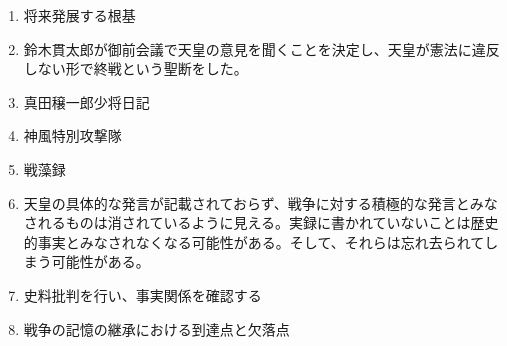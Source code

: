 \documentclass[]{jsarticle}
\begin{document}
\begin{enumerate}
	\item 将来発展する根基
	\item 鈴木貫太郎が御前会議で天皇の意見を聞くことを決定し、天皇が憲法に違反しない形で終戦という聖断をした。
	\\
	\item 真田穣一郎少将日記
	\item 神風特別攻撃隊
	\item 戦藻録
	\item 天皇の具体的な発言が記載されておらず、戦争に対する積極的な発言とみなされるものは消されているように見える。実録に書かれていないことは歴史的事実とみなされなくなる可能性がある。そして、それらは忘れ去られてしまう可能性がある。
	\item 史料批判を行い、事実関係を確認する
	\item 戦争の記憶の継承における到達点と欠落点
\end{enumerate}
\end{document}
